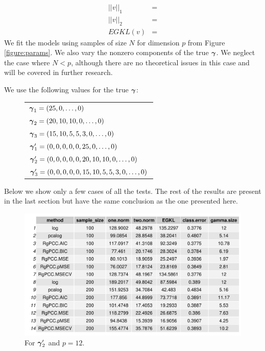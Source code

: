 \documentclass[main.tex]{subfiles}
\begin{document}
\begin{align*}
	||v||_1 &= \\
	||v||_2 &= \\
	EGKL(v) &= 
\end{align*}
We fit the models using samples of size $N$ for dimension $p$ from Figure \ref{figure:params}. We also vary the nonzero components of the true $\boldsymbol \gamma$. We neglect the case where $N < p$, although there are no theoretical issues in this case and will be covered in further research.

We use the following values for the true $\boldsymbol \gamma$:
\begin{figure}[H]
	\begin{tabular}{l}
		$\boldsymbol \gamma_1 = (25, 0, \ldots , 0)$ \\
		$\boldsymbol \gamma_2 = (20, 10, 10, 0, \ldots , 0)$ \\
		$\boldsymbol \gamma_3 = (15, 10, 5, 5, 3, 0, \ldots , 0)$\\
		$\boldsymbol \gamma_1' = (0, 0, 0, 0, 0, 25, 0, \ldots , 0)$ \\
		$\boldsymbol \gamma_2' = (0, 0, 0, 0, 0,  20, 10, 10, 0, \ldots , 0)$ \\
		$\boldsymbol \gamma_3' = (0, 0, 0, 0, 0,  15, 10, 5, 5, 3, 0, \ldots , 0)$
	\end{tabular}
\end{figure}

Below we show only a few cases of all the tests. The rest of the results are present in the last section but have the same conclusion as the one presented here.
\begin{figure}[H]
    \centering
    \includegraphics[width =  \textwidth]{simulated/(sparsity3-nonlead,12)_metrics.pdf}
    \caption{For $\boldsymbol \gamma_2'$ and $p = 12$.}
    \label{fig:simulated2-12}
\end{figure}
\end{document}
